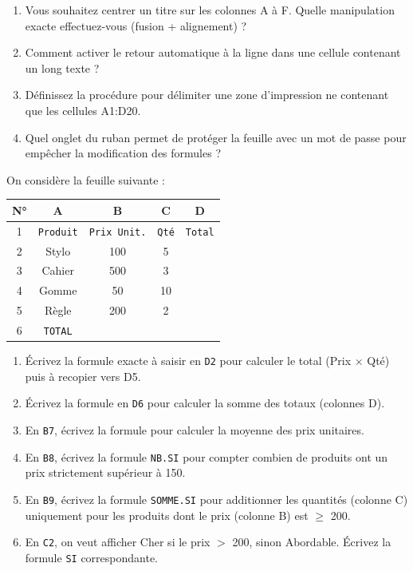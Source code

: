 \documentclass[11pt]{article}
\begin{document}
\begin{exercice}
\begin{enumerate}
    \item Vous souhaitez centrer un titre sur les colonnes A à F. Quelle manipulation exacte effectuez-vous (fusion + alignement) ?
    \item Comment activer le \og{}retour automatique à la ligne\fg{} dans une cellule contenant un long texte ?
    \item Définissez la procédure pour délimiter une \og{}zone d'impression\fg{} ne contenant que les cellules A1:D20.
    \item Quel onglet du ruban permet de \og{}protéger la feuille\fg{} avec un mot de passe pour empêcher la modification des formules ?
\end{enumerate}
\end{exercice}

\begin{exercice}
On considère la feuille suivante :
\begin{center}
\begin{tabular}{|c|c|c|c|c|}
\hline
\textbf{N°} & \textbf{A} & \textbf{B} & \textbf{C} & \textbf{D} \\ \hline
1 & \texttt{Produit} & \texttt{Prix Unit.} & \texttt{Qté} & \texttt{Total} \\ \hline
2 & Stylo & 100 & 5 & \\ \hline
3 & Cahier & 500 & 3 & \\ \hline
4 & Gomme & 50 & 10 & \\ \hline
5 & Règle & 200 & 2 & \\ \hline
6 & \texttt{TOTAL} & & & \\ \hline
\end{tabular}
\end{center}
\begin{enumerate}
    \item Écrivez la formule exacte à saisir en \texttt{D2} pour calculer le total (Prix $\times$ Qté) puis à recopier vers D5.
    \item Écrivez la formule en \texttt{D6} pour calculer la somme des totaux (colonnes D).
    \item En \texttt{B7}, écrivez la formule pour calculer la moyenne des prix unitaires.
    \item En \texttt{B8}, écrivez la formule \texttt{NB.SI} pour compter combien de produits ont un prix strictement supérieur à 150.
    \item En \texttt{B9}, écrivez la formule \texttt{SOMME.SI} pour additionner les quantités (colonne C) uniquement pour les produits dont le prix (colonne B) est $\ge$ 200.
    \item En \texttt{C2}, on veut afficher \og{}Cher\fg{} si le prix $>$ 200, sinon \og{}Abordable\fg{}. Écrivez la formule \texttt{SI} correspondante.
\end{enumerate}
\end{exercice}
\end{document}
